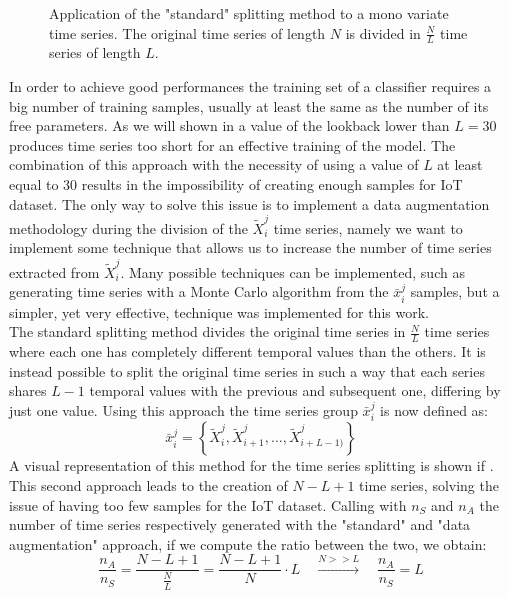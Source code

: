 \begin{figure}[h]
    \centering

\caption{Application of the "standard" splitting method to a mono variate time series. The original time series of length $N$ is divided in $\frac{N}{L}$ time series of length $L$.}
    \label{fig:ts_split_std}
\end{figure}

In order to achieve good performances the training set of a classifier requires a big number of training samples, usually at least the same as the number of its free parameters. As we will shown in  a value of the lookback lower than $L=30$ produces time series too short for an effective training of the model. 
The combination of this approach with the necessity of using a value of $L$ at least equal to 30 results in the impossibility of creating enough samples for IoT dataset. The only way to solve this issue is to implement a data augmentation methodology during the division of the ${\tilde{X}_i^j}$ time series, namely we want to implement some technique that allows us to increase the number of time series extracted from ${\tilde{X}_i^j}$. Many possible techniques\cite{data_aug} can be implemented, such as generating time series with a Monte Carlo algorithm from the $\bar{x}_i^j$ samples, but a simpler, yet very effective, technique was implemented for this work. \\
The standard splitting method divides the original time series in $\frac{N}{L}$ time series where each one has completely different temporal values than the others. It is instead possible to split the original time series in such a way that each series shares $L-1$ temporal values with the previous and subsequent one, differing by just one value. Using this approach the time series group $\bar{x}_i^j$
is now defined as:
\begin{equation}
    \bar{x}_i^j = \left\{\tilde{X}_{i}^j, \tilde{X}_{i +1 }^j, \dots, \tilde{X}_{i+L-1)}^j  \right\}
\end{equation}
A visual representation of this method for the time series splitting is shown if .
This second approach leads to the creation of $N-L+1$ time series, solving the issue of having too few samples for the IoT dataset. Calling with $n_S$ and $n_A$ the number of time series respectively generated with the "standard" and "data augmentation" approach, if we compute the ratio between the two, we obtain:
\begin{equation}
    \frac{n_A}{n_S} = \frac{N-L+1}{\frac{N}{L}} = \frac{N-L+1}{N}\cdot L \quad \xrightarrow{N>>L}
    \quad \frac{n_A}{n_S}= L 
\end{equation}
